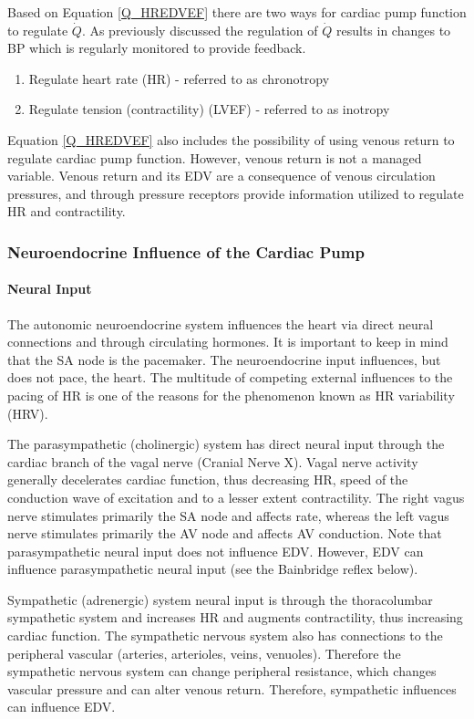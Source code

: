 Based on Equation \ref{Q_HREDVEF} there are two ways for cardiac pump function to regulate $\dot{Q}$. As previously discussed the regulation of $\dot{Q}$ results in changes to BP which is regularly monitored to provide feedback.

\begin{enumerate}
    \item Regulate heart rate (HR) - referred to as chronotropy
    \item Regulate tension (contractility) (LVEF) - referred to as inotropy
\end{enumerate}

Equation \ref{Q_HREDVEF} also includes the possibility of using venous return to regulate cardiac pump function. However, venous return is not a managed variable. Venous return and its EDV are a consequence of venous circulation pressures, and through pressure receptors provide information utilized to regulate HR and contractility.

\subsubsection{Neuroendocrine Influence of the Cardiac Pump}

\paragraph{Neural Input}

The autonomic neuroendocrine system influences the heart via direct neural connections and through circulating hormones. It is important to keep in mind that the SA node is the pacemaker. The neuroendocrine input influences, but does not pace, the heart. The multitude of competing external influences to the pacing of HR is one of the reasons for the phenomenon known as HR variability (HRV). 

The parasympathetic (cholinergic) system has direct neural input through the cardiac branch of the vagal nerve (Cranial Nerve X). Vagal nerve activity generally decelerates cardiac function, thus decreasing HR, speed of the conduction wave of excitation and to a lesser extent contractility. The right vagus nerve stimulates primarily the SA node and affects rate, whereas the left vagus nerve stimulates primarily the AV node and affects AV conduction. Note that parasympathetic neural input does not influence EDV. However, EDV can influence parasympathetic neural input (see the Bainbridge reflex below).

Sympathetic (adrenergic) system neural input is through the thoracolumbar sympathetic system and increases HR and augments contractility, thus increasing cardiac function. The sympathetic nervous system also has connections to the peripheral vascular (arteries, arterioles, veins, venuoles). Therefore the sympathetic nervous system can change peripheral resistance, which changes vascular pressure and can alter venous return. Therefore, sympathetic influences can influence EDV. 

